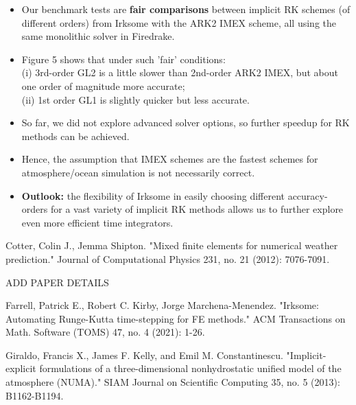 \documentclass[a4paper,10pt]{article}
\newcommand{\checkit}[1]{{\color{red}#1}}
\begin{document}
   \begin{itemize}
    \item Our benchmark tests are \textbf{fair comparisons} between implicit RK schemes (of different orders) from Irksome with the ARK2 IMEX scheme, all using the same monolithic solver in Firedrake.

   \item Figure 5 shows that under such 'fair' conditions:\\
   (i) 3rd-order GL2 is a little slower than 2nd-order ARK2 IMEX, but about one order of magnitude more accurate; \\
   (ii) 1st order GL1 is slightly quicker but less accurate.

  \item So far, we did not explore advanced solver options, so further speedup for RK methods can be achieved.


   \item Hence, the assumption that IMEX schemes are the fastest schemes for atmosphere/ocean simulation is not necessarily correct.

   \item \textbf{Outlook:} the flexibility of Irksome in easily choosing different accuracy-orders for a vast variety of implicit RK methods allows us to further explore even more efficient time integrators.
   \end{itemize}



\begin{thebibliography}{8}
 Cotter, Colin J., Jemma Shipton. "Mixed finite elements for numerical weather prediction." Journal of Computational Physics 231, no. 21 (2012): 7076-7091.

\checkit{ADD PAPER DETAILS}

 Farrell, Patrick E., Robert C. Kirby, Jorge Marchena-Menendez. "Irksome: Automating Runge-Kutta time-stepping for FE methods." ACM Transactions on Math. Software (TOMS) 47, no. 4 (2021): 1-26.

 Giraldo, Francis X., James F. Kelly, and Emil M. Constantinescu. "Implicit-explicit formulations of a three-dimensional nonhydrostatic unified model of the atmosphere (NUMA)." SIAM Journal on Scientific Computing 35, no. 5 (2013): B1162-B1194.
\end{thebibliography}
\end{document}
